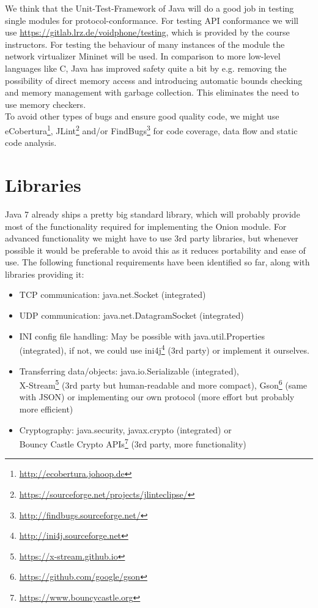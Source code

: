 \documentclass{article}
\begin{document}
We think that the Unit-Test-Framework of Java will do a good job in testing
single modules for protocol-conformance. For testing API
conformance we will use \url{https://gitlab.lrz.de/voidphone/testing}, which is
provided by the course instructors. For testing the behaviour of many instances
of the module the network virtualizer Mininet will be used.
In comparison to more low-level languages like C, Java has improved safety quite a bit by e.g. removing the possibility of direct memory access and introducing automatic bounds checking and memory management with garbage collection. This eliminates the need to use memory checkers. \\
To avoid other types of bugs and ensure good quality code, we might use eCobertura\footnote{\url{http://ecobertura.johoop.de}}, JLint\footnote{\url{https://sourceforge.net/projects/jlinteclipse/}} and/or FindBugs\footnote{\url{http://findbugs.sourceforge.net/}} for code coverage, data flow and static code analysis.

\section{Libraries}
Java 7 already ships a pretty big standard library, which will probably provide most of the functionality required for implementing the Onion module. For advanced functionality we might have to use 3rd party libraries, but whenever possible it would be preferable to avoid this as it reduces portability and ease of use. 
The following functional requirements have been identified so far, along with libraries providing it:
\begin{itemize}
\item TCP communication: java.net.Socket (integrated)
\item UDP communication: java.net.DatagramSocket (integrated)
\item INI config file handling: May be possible with java.util.Properties (integrated), if not, we could use ini4j\footnote{\url{http://ini4j.sourceforge.net}} (3rd party) or implement it ourselves.
\item Transferring data/objects: java.io.Serializable (integrated), \\ X-Stream\footnote{\url{https://x-stream.github.io}} (3rd party but human-readable and more compact), Gson\footnote{\url{https://github.com/google/gson}} (same with JSON) or implementing our own protocol (more effort but probably more efficient)
\item Cryptography: java.security, javax.crypto (integrated) or \\ Bouncy Castle Crypto APIs\footnote{\url{https://www.bouncycastle.org}} (3rd party, more functionality)
\end{itemize}
\end{document}
